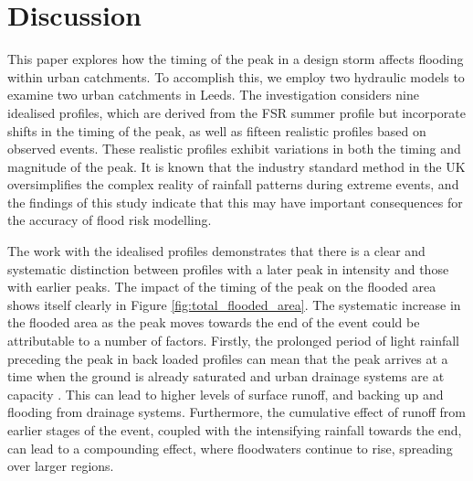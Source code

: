 \documentclass[APA,Times2COL]{WileyNJDv5}
\begin{document}
\section{Discussion}\label{sec:discussion}
This paper explores how the timing of the peak in a design storm affects flooding within urban catchments. To accomplish this, we employ two hydraulic models to examine two urban catchments in Leeds. The investigation considers nine idealised profiles, which are derived from the FSR summer profile but incorporate shifts in the timing of the peak, as well as  fifteen realistic profiles based on observed events. These realistic profiles exhibit variations in both the timing and magnitude of the peak. It is known that the industry standard method in the UK oversimplifies the complex reality of rainfall patterns during extreme events, and the findings of this study indicate that this may have important consequences for the accuracy of flood risk modelling.


The work with the idealised profiles demonstrates that there is a clear and systematic distinction between profiles with a later peak in intensity and those with earlier peaks. The impact of the timing of the peak on the flooded area shows itself clearly in Figure \ref{fig:total_flooded_area}. The systematic increase in the flooded area as the peak moves towards the end of the event could be attributable to a number of factors. Firstly, the prolonged period of light rainfall preceding the peak in back loaded profiles can mean that the peak arrives at a time when the ground is already saturated and urban drainage systems are at capacity \citep{hettiarachchi2018increase}. This can lead to higher levels of surface runoff, and backing up and flooding from drainage systems. Furthermore, the cumulative effect of runoff from earlier stages of the event, coupled with the intensifying rainfall towards the end, can lead to a compounding effect, where floodwaters continue to rise, spreading over larger regions. 
\end{document}
